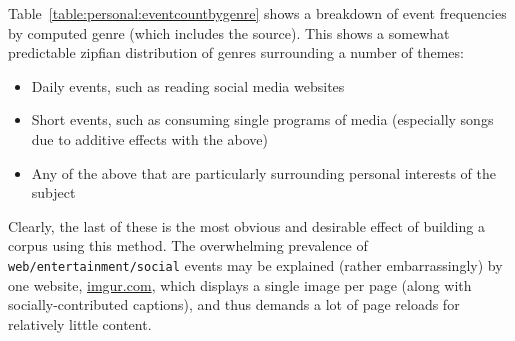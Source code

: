 Table~\ref{table:personal:eventcountbygenre} shows a breakdown of event frequencies by computed genre (which includes the source).  This shows a somewhat predictable zipfian distribution of genres surrounding a number of themes:

\begin{itemize}
    \item Daily events, such as reading social media websites
    \item Short events, such as consuming single programs of media (especially songs due to additive effects with the above)
    \item Any of the above that are particularly surrounding personal interests of the subject
\end{itemize}

Clearly, the last of these is the most obvious and desirable effect of building a corpus using this method.  The overwhelming prevalence of \texttt{web/entertainment/social} events may be explained (rather embarrassingly) by one website, \url{imgur.com}, which displays a single image per page (along with socially-contributed captions), and thus demands a lot of page reloads for relatively little content.


